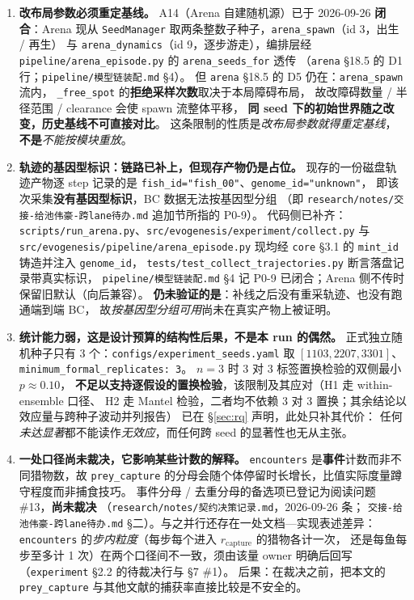 \begin{enumerate}
  \item \textbf{改布局参数必须重定基线。}
  A14（Arena 自建随机源）已于 2026-09-26 \textbf{闭合}：Arena 现从
  \texttt{SeedManager} 取两条整数子种子，\texttt{arena\_spawn}（id 3，出生 / 再生）
  与 \texttt{arena\_dynamics}（id 9，逐步游走），编排层经
  \texttt{pipeline/arena\_episode.py} 的 \texttt{arena\_seeds\_for} 透传
  （\texttt{arena} \S18.5 的 D1 行；\texttt{pipeline/模型链装配.md} \S4）。
  但 \texttt{arena} \S18.5 的 D5 仍在：\texttt{arena\_spawn} 流内，
  \texttt{\_free\_spot} 的\textbf{拒绝采样次数}取决于本局障碍布局，
  故改障碍数量 / 半径范围 / clearance 会使 spawn 流整体平移，
  \textbf{同 seed 下的初始世界随之改变，历史基线不可直接对比}。
  这条限制的性质是\emph{改布局参数就得重定基线}，\textbf{不是}\emph{不能按模块重放}。
  \item \textbf{轨迹的基因型标识：链路已补上，但现存产物仍是占位。}
  现存的一份磁盘轨迹产物逐 step 记录的是
  \texttt{fish\_id="fish\_00"}、\texttt{genome\_id="unknown"}，
  即该次采集\textbf{没有基因型标识}，BC 数据无法按基因型分组
  （即 \texttt{research/notes/交接-给池伟豪-跨lane待办.md} 追加节所指的 P0-9）。
  代码侧已补齐：\texttt{scripts/run\_arena.py}、\texttt{src/evogenesis/experiment/collect.py}
  与 \texttt{src/evogenesis/pipeline/arena\_episode.py} 现均经 \texttt{core} \S3.1 的
  \texttt{mint\_id} 铸造并注入 \texttt{genome\_id}，
  \texttt{tests/test\_collect\_trajectories.py} 断言落盘记录带真实标识，
  \texttt{pipeline/模型链装配.md} \S4 记 P0-9 已闭合；Arena 侧不传时保留旧默认（向后兼容）。
  \textbf{仍未验证的是}：补线之后没有重采轨迹、也没有跑通端到端 BC，
  故\emph{按基因型分组可用}尚未在真实产物上被证明。

  \item \textbf{统计能力弱，这是设计预算的结构性后果，不是本 run 的偶然。}
  正式独立随机种子只有 3 个：\texttt{configs/experiment\_seeds.yaml} 取
  $[1103,2207,3301]$、\texttt{minimum\_formal\_replicates: 3}。
  $n=3$ 时 3 对 3 标签置换检验的双侧最小 $p\approx0.10$，
  \textbf{不足以支持逐假设的置换检验}，该限制及其应对（H1 走 within-ensemble 口径、
  H2 走 Mantel 检验，二者均不依赖 3 对 3 置换；其余结论以效应量与跨种子波动并列报告）
  已在 \S\ref{sec:rq} 声明，此处只补其代价：
  任何\emph{未达显著}都不能读作\emph{无效应}，而任何跨 seed 的显著性也无从主张。

  \item \textbf{一处口径尚未裁决，它影响某些计数的解释。}
  \texttt{encounters} 是\textbf{事件}计数而非不同猎物数，故
  \texttt{prey\_capture} 的分母会随个体停留时长增长，比值实际度量蹲守程度而非捕食技巧。
  事件分母 / 去重分母的备选项已登记为阅读问题 \#13，\textbf{尚未裁决}
  （\texttt{research/notes/契约决策记录.md}，2026-09-26 条；
  \texttt{交接-给池伟豪-跨lane待办.md} \S{}二）。与之并行还存在一处文档—实现表述差异：
  \texttt{encounters} 的\emph{步内粒度}（每步每个进入 $r_{\text{capture}}$ 的猎物各计一次，
  还是每鱼每步至多计 1 次）在两个口径间不一致，须由该量 owner 明确后回写
  （\texttt{experiment} \S2.2 的待裁决行与 \S7 \#1）。
  后果：在裁决之前，把本文的 \texttt{prey\_capture} 与其他文献的捕获率直接比较是不安全的。


\end{enumerate}
